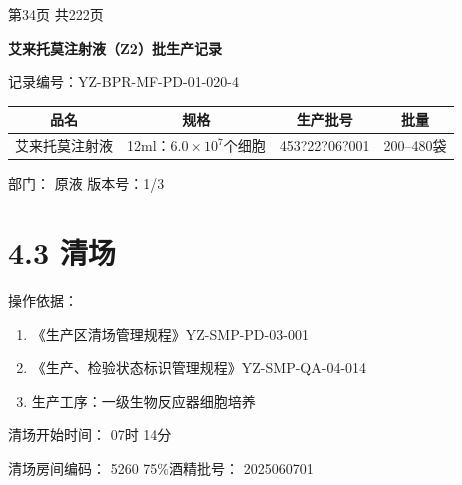\documentclass[UTF8,10pt,a4paper,fontset=fandol]{ctexart}
\newcommand{\fieldvalue}[1]{#1}
\newcommand{\handwritten}[1]{#1}
\begin{document}
\vfill

\begin{center}
第34页 共222页
\end{center}

\newpage

\begin{center}
\textbf{艾来托莫注射液（Z2）批生产记录}
\end{center}

\noindent
记录编号：YZ-BPR-MF-PD-01-020-4

\begin{center}
\begin{tabular}{|c|c|c|c|}
\hline
品名 & 规格 & 生产批号 & 批量 \\
\hline
艾来托莫注射液 & 12ml：$6.0\times10^{7}$个细胞 &
\fieldvalue{\handwritten{453?22?06?001}} &
200--480袋 \\
\hline
\end{tabular}
\end{center}

\noindent
部门：
\fieldvalue{原液}
\hfill
版本号：1/3

\section*{4.3 清场}

\noindent
操作依据：

\begin{enumerate}
\item 《生产区清场管理规程》\hfill YZ-SMP-PD-03-001
\item 《生产、检验状态标识管理规程》\hfill YZ-SMP-QA-04-014
\item 生产工序：一级生物反应器细胞培养
\end{enumerate}

\noindent
清场开始时间：
\fieldvalue{\handwritten{07}}时
\fieldvalue{\handwritten{14}}分

\noindent
清场房间编码：
\fieldvalue{\handwritten{5260}}
\hfill
75\%酒精批号：
\fieldvalue{\handwritten{2025060701}}
\end{document}
